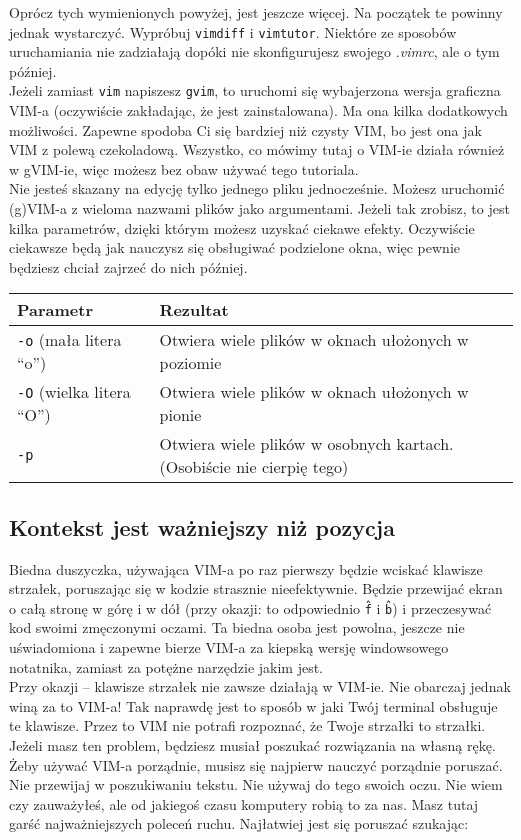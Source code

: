 \documentclass[a4paper,12pt]{article}
\begin{document}
\noindent
Oprócz tych wymienionych powyżej, jest jeszcze więcej. Na początek te powinny jednak wystarczyć. Wypróbuj {\tt vimdiff} i {\tt vimtutor}. Niektóre ze sposobów uruchamiania nie zadziałają dopóki nie skonfigurujesz swojego {\it .vimrc}, ale o tym później.\\
Jeżeli zamiast {\tt vim} napiszesz {\tt gvim}, to uruchomi się wybajerzona wersja graficzna VIM-a (oczywiście zakładając, że jest zainstalowana). Ma ona kilka dodatkowych możliwości. Zapewne spodoba Ci się bardziej niż czysty VIM, bo jest ona jak VIM z polewą czekoladową. Wszystko, co mówimy tutaj o VIM-ie działa również w gVIM-ie, więc możesz bez obaw używać tego tutoriala.\\
Nie jesteś skazany na edycję tylko jednego pliku jednocześnie. Możesz uruchomić (g)VIM-a z wieloma nazwami plików jako argumentami. Jeżeli tak zrobisz, to jest kilka parametrów, dzięki którym możesz uzyskać ciekawe efekty. Oczywiście ciekawsze będą jak nauczysz się obsługiwać podzielone okna, więc pewnie będziesz chciał zajrzeć do nich później.

\begin{tabular}{ l | p{} }
{\bf Parametr} & {\bf Rezultat} \\ \hline
{\tt -o} (mała litera “o”) & Otwiera wiele plików w oknach ułożonych w poziomie \\
{\tt -O} (wielka litera “O”) & Otwiera wiele plików w oknach ułożonych w pionie \\
{\tt -p} & Otwiera wiele plików w osobnych kartach. (Osobiście nie cierpię tego) \\ \hline
\end{tabular}

\subsection{Kontekst jest ważniejszy niż pozycja}
Biedna duszyczka, używająca VIM-a po raz pierwszy będzie wciskać klawisze strzałek, poruszając się w kodzie strasznie nieefektywnie. Będzie przewijać ekran o całą stronę w górę i w dół (przy okazji: to odpowiednio {\tt \^f} i {\tt \^b}) i przeczesywać kod swoimi zmęczonymi oczami. Ta biedna osoba jest powolna, jeszcze nie uświadomiona i zapewne bierze VIM-a za kiepską wersję windowsowego notatnika, zamiast za potężne narzędzie jakim jest.\\
Przy okazji -- klawisze strzałek nie zawsze działają w VIM-ie. Nie obarczaj jednak winą za to VIM-a! Tak naprawdę jest to sposób w jaki Twój terminal obsługuje te klawisze. Przez to VIM nie potrafi rozpoznać, że Twoje strzałki to strzałki. Jeżeli masz ten problem, będziesz musiał poszukać rozwiązania na własną rękę.\\
Żeby używać VIM-a porządnie, musisz się najpierw nauczyć porządnie poruszać.\\
Nie przewijaj w poszukiwaniu tekstu. Nie używaj do tego swoich oczu. Nie wiem czy zauważyłeś, ale od jakiegoś czasu komputery robią to za nas. Masz tutaj garść najważniejszych poleceń ruchu. Najłatwiej jest się poruszać szukając:
\end{document}
